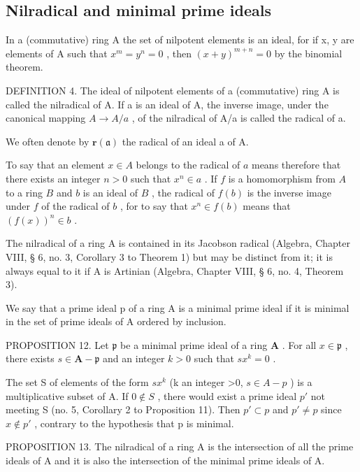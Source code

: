 \subsection{Nilradical and minimal prime ideals}

In a (commutative) ring A the set of nilpotent elements is an ideal, for if x, y are elements of A such that \(x^{m} = y^{n} = 0\) , then \((x + y)^{m+n} = 0\) by the binomial theorem.

DEFINITION 4. The ideal of nilpotent elements of a (commutative) ring A is called the nilradical of A. If a is an ideal of A, the inverse image, under the canonical mapping \(A \rightarrow A/a\) , of the nilradical of A/a is called the radical of a.

We often denote by \(\mathbf{r}(\mathfrak{a})\) the radical of an ideal a of A.

To say that an element \(x \in A\) belongs to the radical of \(a\) means therefore that there exists an integer \(n > 0\) such that \(x^n \in a\) . If \(f\) is a homomorphism from \(A\) to a ring \(B\) and \(b\) is an ideal of \(B\) , the radical of \(f(b)\) is the inverse image under \(f\) of the radical of \(b\) , for to say that \(x^n \in f(b)\) means that \((f(x))^n \in b\) .

The nilradical of a ring A is contained in its Jacobson radical (Algebra, Chapter VIII, § 6, no. 3, Corollary 3 to Theorem 1) but may be distinct from it; it is always equal to it if A is Artinian (Algebra, Chapter VIII, § 6, no. 4, Theorem 3).

We say that a prime ideal p of a ring A is a minimal prime ideal if it is minimal in the set of prime ideals of A ordered by inclusion.

PROPOSITION 12. Let \(\mathfrak{p}\) be a minimal prime ideal of a ring \(\mathbf{A}\) . For all \(x \in \mathfrak{p}\) , there exists \(s \in \mathbf{A} - \mathfrak{p}\) and an integer \(k > 0\) such that \(sx^k = 0\) .

The set S of elements of the form \(sx^{k}\) (k an integer \textgreater0, \(s \in A - p\) ) is a multiplicative subset of A. If \(0 \notin S\) , there would exist a prime ideal \(p'\) not meeting S (no. 5, Corollary 2 to Proposition 11). Then \(p' \subset p\) and \(p' \neq p\) since \(x \notin p'\) , contrary to the hypothesis that p is minimal.

PROPOSITION 13. The nilradical of a ring A is the intersection of all the prime ideals of A and it is also the intersection of the minimal prime ideals of A.

